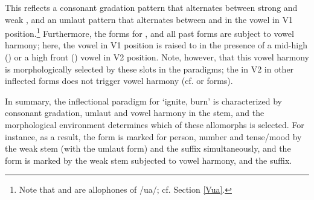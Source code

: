 This reflects a consonant gradation pattern that alternates between strong  and weak , and an umlaut pattern that alternates between  and  in the vowel in V1 position.\footnote{Note that  and  are allophones of /ua/; cf. Section \ref{Vua}.} 
Furthermore, the forms for ,  and all past forms are subject to vowel harmony; here, the vowel in V1 position is raised to  in the presence of a mid-high () or a high front () vowel in V2 position. Note, however, that this vowel harmony is morphologically selected by these slots in the paradigms; the  in V2 in other inflected forms does not trigger vowel harmony (cf.  or  forms). 

In summary, the inflectional paradigm for  ‘ignite, burn’ is characterized by consonant gradation, umlaut and vowel harmony in the stem, and the morphological environment determines which of these allomorphs is selected. %
For instance, as a result, the  form  is marked for person, number and tense/mood by the weak  stem (with the  umlaut form) and the  suffix simultaneously, and the  form  is marked by the weak  stem subjected to vowel harmony, and the  suffix. 

